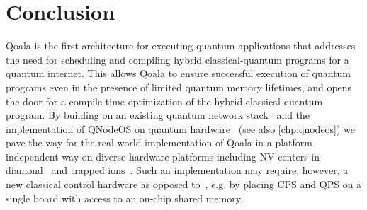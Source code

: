 \section{Conclusion}
\label{qoala:sec:conclusion}
Qoala is the first architecture for executing quantum applications that addresses the need for scheduling and compiling hybrid classical-quantum programs for a quantum internet.
This allows Qoala to ensure successful execution of quantum programs even in the presence of limited quantum memory lifetimes, and opens the door for a compile time optimization of the hybrid classical-quantum program.
By building on an existing quantum network stack~\cite{dahlberg2019link, pompili2022experimental} and the implementation of QNodeOS on quantum hardware~\cite{pompili2022experimental, donne_design_2024} (see also \cref{chp:qnodeos}) we pave the way for the real-world implementation of Qoala in a platform-independent way on diverse hardware platforms including NV centers in diamond~\cite{pompili2021realization, pompili2022experimental} and trapped ions~\cite{krutyanskiy2023entanglement,krutyanskiy2023telecom}.
Such an implementation may require, however, a new classical control hardware as opposed to~\cite{pompili2022experimental, donne_design_2024}, e.g. by placing CPS and QPS on a single board with access to an on-chip shared memory. 

